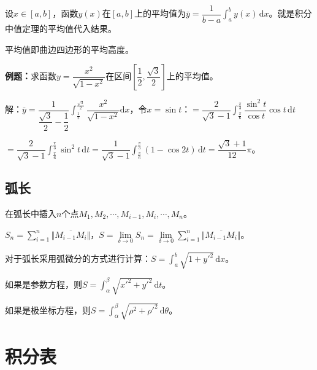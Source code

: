\documentclass[UTF8, 12pt]{ctexart}
\begin{document}
设$x\in[a,b]$，函数$y(x)$在$[a,b]$上的平均值为$\bar{y}=\dfrac{1}{b-a}\int_a^by(x)\,\textrm{d}x$。就是积分中值定理的平均值代入结果。

平均值即曲边四边形的平均高度。

\textbf{例题：}求函数$y=\dfrac{x^2}{\sqrt{1-x^2}}$在区间$\left[\dfrac{1}{2},\dfrac{\sqrt{3}}{2}\right]$上的平均值。

解：$\bar{y}=\dfrac{1}{\dfrac{\sqrt{3}}{2}-\dfrac{1}{2}}\displaystyle{\int_\frac{1}{2}^\frac{\sqrt{3}}{2}\dfrac{x^2}{\sqrt{1-x^2}}\textrm{d}x}$，令$x=\sin t$：$=\dfrac{2}{\sqrt{3}-1}\displaystyle{\int_\frac{\pi}{6}^\frac{\pi}{3}\dfrac{\sin^2t}{\cos t}\cos t\,\textrm{d}t}$ \medskip

$=\dfrac{2}{\sqrt{3}-1}\int_\frac{\pi}{6}^\frac{\pi}{3}\sin^2t\,\textrm{d}t=\dfrac{1}{\sqrt{3}-1}\int_\frac{\pi}{6}^\frac{\pi}{3}(1-\cos2t)\,\textrm{d}t=\dfrac{\sqrt{3}+1}{12}\pi$。

\subsection{弧长}

在弧长中插入$n$个点$M_1,M_2,\cdots,M_{i-1},M_i,\cdots,M_n$。

$S_n=\sum\limits_{i=1}^n\Vert\overline{M_{i-1}M_{i}}\Vert$，$S=\lim\limits_{\delta\to 0}S_n=\lim\limits_{\delta\to 0}\sum\limits_{i=1}^n\Vert\overline{M_{i-1}M_{i}}\Vert$。

对于弧长采用弧微分的方式进行计算：$S=\int_a^b\sqrt{1+y'^2}\,\textrm{d}x$。

如果是参数方程，则$S=\int_\alpha^\beta\sqrt{x'^2+y'^2}\,\textrm{d}t$。

如果是极坐标方程，则$S=\int_\alpha^\beta\sqrt{\rho^2+\rho'^2}\,\textrm{d}\theta$。

\section{积分表}
\end{document}
